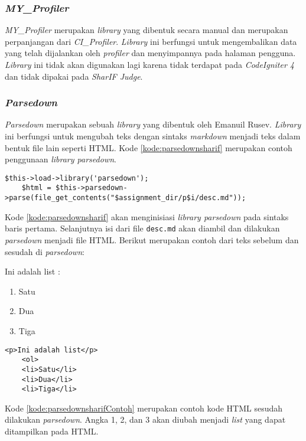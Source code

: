 \subsubsection{\textit{MY\_Profiler}}
\textit{MY\_Profiler} merupakan \textit{library} yang dibentuk secara manual dan merupakan perpanjangan dari \textit{CI\_Profiler}. \textit{Library} ini berfungsi untuk mengembalikan data yang telah dijalankan oleh \textit{profiler} dan menyimpannya pada halaman pengguna. \textit{Library} ini tidak akan digunakan lagi karena tidak terdapat pada \textit{CodeIgniter 4} dan tidak dipakai pada \textit{SharIF Judge}.

\subsubsection{\textit{Parsedown}}
\textit{Parsedown} merupakan sebuah \textit{library} yang dibentuk oleh Emanuil Rusev. \textit{Library} ini berfungsi untuk mengubah teks dengan sintaks \textit{markdown} menjadi teks dalam bentuk file lain seperti HTML. Kode \ref{kode:parsedownsharif} merupakan contoh penggunaan \textit{library parsedown}.

\begin{lstlisting}[caption=Contoh kode penggunaan \textit{Library Parsedown}, label=kode:parsedownsharif]
	$this->load->library('parsedown');
	$html = $this->parsedown->parse(file_get_contents("$assignment_dir/p$i/desc.md"));
\end{lstlisting}

Kode \ref{kode:parsedownsharif} akan menginisiasi \textit{library parsedown} pada sintaks baris pertama. Selanjutnya isi dari file \texttt{desc.md} akan diambil dan dilakukan \textit{parsedown} menjadi file HTML. Berikut merupakan contoh dari teks sebelum dan sesudah di \textit{parsedown}:

Ini adalah list :
\begin{enumerate}
	\item Satu
	\item Dua
	\item Tiga
\end{enumerate}

\begin{lstlisting}[caption=Contoh kode sesudah dilakukan \textit{parsedown}, label=kode:parsedownsharifContoh]
	<p>Ini adalah list</p>
	<ol>
	<li>Satu</li>
	<li>Dua</li>
	<li>Tiga</li>
\end{lstlisting}

Kode \ref{kode:parsedownsharifContoh} merupakan contoh kode HTML sesudah dilakukan \textit{parsedown}. Angka 1, 2, dan 3 akan diubah menjadi \textit{list} yang dapat ditampilkan pada HTML.

